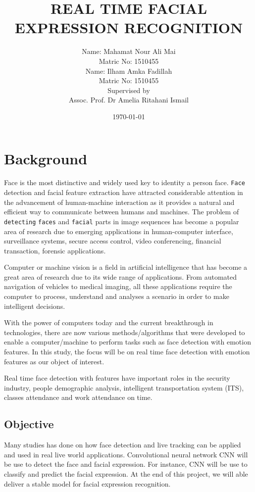 \documentclass[12pt]{report}
\title{\bf REAL TIME FACIAL EXPRESSION RECOGNITION }
\author{ Name: Mahamat Nour Ali Mai\\
	Matric No: 1510455 \\ 
	[1cm]
	Name: Ilham Amka Fadillah \\
	Matric No: 1510455\\
	[1cm]
	Supervised by\\
	[1.5cm]
	Assoc. Prof. Dr Amelia Ritahani Ismail\\}
\date{\today}
\begin{document}
                        
\maketitle                              
{}                   
\setcounter{page}{2}                    
\tableofcontents                        

\chapter{Background}               
Face is the most distinctive and widely used key to
identity a person face. \texttt{Face} detection and facial feature extraction have attracted considerable attention in the advancement of human-machine interaction as it provides a natural and efficient way to communicate between humans and machines. The problem of \texttt{detecting} \texttt{faces} and \texttt{facial} parts in image sequences has become a popular area of research due to emerging applications in human-computer interface, surveillance systems, secure access control, video conferencing, financial transaction, forensic applications.

Computer or machine vision is a field in artificial intelligence that has become a great area of research due to its wide range of applications. From automated navigation of vehicles to medical imaging, all these applications require the computer to process, understand and analyses a scenario in order to make intelligent decisions.

With the power of computers today and the current breakthrough in technologies,
there are now various methods/algorithms that were developed to enable a
computer/machine to perform tasks such as face detection with emotion features. In this study, the focus will be on real time face detection with emotion features as our object of interest. 

Real time face detection with features have important roles in the security industry,
people demographic analysis, intelligent transportation system (ITS), classes attendance and work attendance on time.

\section{Objective}                 
Many studies has done on how face detection and live tracking can be applied and used in real live world applications. Convolutional neural network CNN will be use to detect the face and facial expression. For instance, CNN will be use to classify and  predict the facial expression. At the end of this project, we will able deliver a stable model for facial expression recognition.
\end{document}
